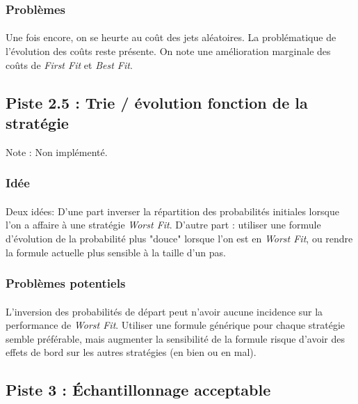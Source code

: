 \documentclass[a4paper,10pt]{report}
\begin{document}
\subsubsection{Problèmes}

\paragraph{}
  Une fois encore, on se heurte au coût des jets aléatoires. La problématique
de l'évolution des coûts reste présente. On note une amélioration marginale des
coûts de \textit{First Fit} et \textit{Best Fit}.


\subsection{Piste 2.5 : Trie / évolution fonction de la stratégie}

Note : Non implémenté.

\subsubsection{Idée}

\paragraph{}
  Deux idées: D'une part inverser la répartition des probabilités initiales
lorsque l'on a affaire à une stratégie \textit{Worst Fit}. D'autre part :
utiliser une formule d'évolution de la probabilité plus "douce" lorsque l'on
est en \textit{Worst Fit}, ou rendre la formule actuelle plus sensible à la
taille d'un pas.
  
\subsubsection{Problèmes potentiels}

\paragraph{}
  L'inversion des probabilités de départ peut n'avoir aucune incidence sur
la performance de \textit{Worst Fit}. Utiliser une formule générique pour chaque
stratégie semble préférable, mais augmenter la sensibilité de la formule risque
d'avoir des effets de bord sur les autres stratégies (en bien ou en mal).


\subsection{Piste 3 : Échantillonnage acceptable}
\end{document}
